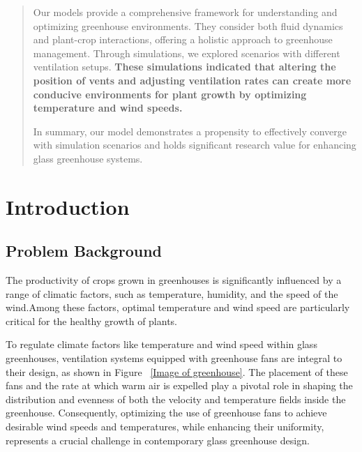 \documentclass{apmcmthesis}
\begin{document}
\begin{abstract}
Our models provide a comprehensive framework for understanding and optimizing greenhouse environments. They consider both fluid dynamics and plant-crop interactions, offering a holistic approach to greenhouse management. Through simulations, we explored scenarios with different ventilation setups. \textbf{These simulations indicated that altering the position of vents and adjusting ventilation rates can create more conducive environments for plant growth by optimizing temperature and wind speeds.}

In summary, our model demonstrates a propensity to effectively converge with simulation scenarios and holds significant research value for enhancing glass greenhouse systems.
\end{abstract}



\newpage
\tableofcontents


\newpage
\pagestyle{mainmatterstyle}
\setcounter{page}{1}
\section{Introduction}
\subsection{Problem Background}
The productivity of crops grown in greenhouses is significantly influenced by a range of climatic factors, such as temperature, humidity, and the speed of the wind.\cite{1}Among these factors, optimal temperature and wind speed are particularly critical for the healthy growth of plants.\cite{2}

To regulate climate factors like temperature and wind speed within glass greenhouses, ventilation systems equipped with greenhouse fans are integral to their design, as shown in Figure ~\ref{Image of greenhouse}. The placement of these fans and the rate at which warm air is expelled play a pivotal role in shaping the distribution and evenness of both the velocity and temperature fields inside the greenhouse. Consequently, optimizing the use of greenhouse fans to achieve desirable wind speeds and temperatures, while enhancing their uniformity, represents a crucial challenge in contemporary glass greenhouse design.
\end{document}
